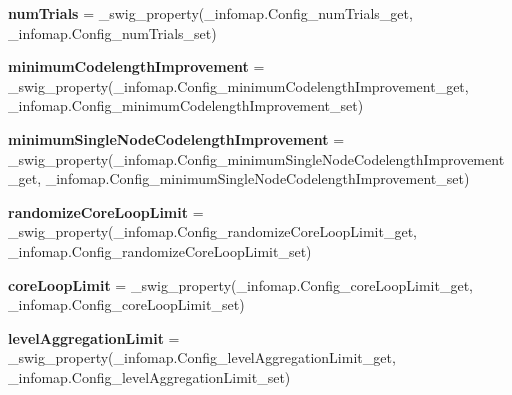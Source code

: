\begin{DoxyCompactItemize}
\item 
\mbox{\label{classdsmacc_1_1graph_1_1infomap_1_1infomap_1_1Config_aa35ddeb66cd5b752ee9e5d6eac8682e9}} 
{\bfseries num\+Trials} = \+\_\+swig\+\_\+property(\+\_\+infomap.\+Config\+\_\+num\+Trials\+\_\+get, \+\_\+infomap.\+Config\+\_\+num\+Trials\+\_\+set)
\item 
\mbox{\label{classdsmacc_1_1graph_1_1infomap_1_1infomap_1_1Config_a86ec868c615b8f5e7e97397f9979493d}} 
{\bfseries minimum\+Codelength\+Improvement} = \+\_\+swig\+\_\+property(\+\_\+infomap.\+Config\+\_\+minimum\+Codelength\+Improvement\+\_\+get, \+\_\+infomap.\+Config\+\_\+minimum\+Codelength\+Improvement\+\_\+set)
\item 
\mbox{\label{classdsmacc_1_1graph_1_1infomap_1_1infomap_1_1Config_a3e7256424793052e1f55c3fe69bd2434}} 
{\bfseries minimum\+Single\+Node\+Codelength\+Improvement} = \+\_\+swig\+\_\+property(\+\_\+infomap.\+Config\+\_\+minimum\+Single\+Node\+Codelength\+Improvement\+\_\+get, \+\_\+infomap.\+Config\+\_\+minimum\+Single\+Node\+Codelength\+Improvement\+\_\+set)
\item 
\mbox{\label{classdsmacc_1_1graph_1_1infomap_1_1infomap_1_1Config_a284b0c56143f5c755002874f21c6df0d}} 
{\bfseries randomize\+Core\+Loop\+Limit} = \+\_\+swig\+\_\+property(\+\_\+infomap.\+Config\+\_\+randomize\+Core\+Loop\+Limit\+\_\+get, \+\_\+infomap.\+Config\+\_\+randomize\+Core\+Loop\+Limit\+\_\+set)
\item 
\mbox{\label{classdsmacc_1_1graph_1_1infomap_1_1infomap_1_1Config_ac4d9144d31eefbada024962a46079bf7}} 
{\bfseries core\+Loop\+Limit} = \+\_\+swig\+\_\+property(\+\_\+infomap.\+Config\+\_\+core\+Loop\+Limit\+\_\+get, \+\_\+infomap.\+Config\+\_\+core\+Loop\+Limit\+\_\+set)
\item 
\mbox{\label{classdsmacc_1_1graph_1_1infomap_1_1infomap_1_1Config_aa3078964c32ff880b518eda33c1c0ce5}} 
{\bfseries level\+Aggregation\+Limit} = \+\_\+swig\+\_\+property(\+\_\+infomap.\+Config\+\_\+level\+Aggregation\+Limit\+\_\+get, \+\_\+infomap.\+Config\+\_\+level\+Aggregation\+Limit\+\_\+set)

\end{DoxyCompactItemize}
